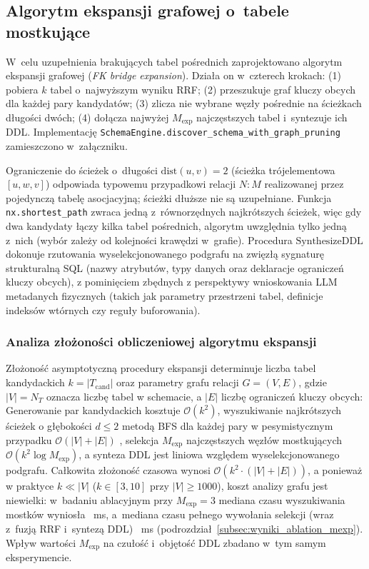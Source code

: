 \subsection{Algorytm ekspansji grafowej o~tabele mostkujące}
\label{subsec:projekt_graph_pruning}

W~celu uzupełnienia brakujących tabel pośrednich zaprojektowano algorytm ekspansji grafowej (\emph{FK bridge expansion}). Działa on w~czterech krokach: (1) pobiera $k$ tabel o~najwyższym wyniku RRF; (2) przeszukuje graf kluczy obcych dla każdej pary kandydatów; (3) zlicza nie wybrane węzły pośrednie na ścieżkach długości dwóch; (4) dołącza najwyżej $M_{\text{exp}}$ najczęstszych tabel i~syntezuje ich DDL. Implementację \texttt{SchemaEngine.discover\_schema\_with\_graph\_pruning} zamieszczono w~załączniku.

Ograniczenie do ścieżek o~długości $\text{dist}(u, v) = 2$ (ścieżka trójelementowa $[u, w, v]$) odpowiada typowemu przypadkowi relacji $N:M$ realizowanej przez pojedynczą tabelę asocjacyjną; ścieżki dłuższe nie są uzupełniane. Funkcja \texttt{nx.shortest\_path} zwraca jedną z~równorzędnych najkrótszych ścieżek, więc gdy dwa kandydaty łączy kilka tabel pośrednich, algorytm uwzględnia tylko jedną z~nich (wybór zależy od kolejności krawędzi w~grafie). Procedura $\text{SynthesizeDDL}$ dokonuje rzutowania wyselekcjonowanego podgrafu na zwięzłą sygnaturę strukturalną SQL (nazwy atrybutów, typy danych oraz deklaracje ograniczeń kluczy obcych), z pominięciem zbędnych z perspektywy wnioskowania LLM metadanych fizycznych (takich jak parametry przestrzeni tabel, definicje indeksów wtórnych czy reguły buforowania).

\subsubsection*{Analiza złożoności obliczeniowej algorytmu ekspansji}
Złożoność asymptotyczną procedury ekspansji determinuje liczba tabel kandydackich $k = |T_{\text{cand}}|$ oraz parametry grafu relacji $G = (V, E)$, gdzie $|V| = N_T$ oznacza liczbę tabel w schemacie, a $|E|$ liczbę ograniczeń kluczy obcych:
Generowanie par kandydackich kosztuje $\mathcal{O}(k^2)$, wyszukiwanie najkrótszych ścieżek o głębokości $d \le 2$ metodą BFS dla każdej pary w pesymistycznym przypadku $\mathcal{O}(|V| + |E|)$ , selekcja $M_{\text{exp}}$ najczęstszych węzłów mostkujących $\mathcal{O}(k^2 \log M_{\text{exp}})$, a synteza DDL jest liniowa względem wyselekcjonowanego podgrafu.
Całkowita złożoność czasowa wynosi $\mathcal{O}(k^2 \cdot (|V| + |E|))$, a ponieważ w praktyce $k \ll |V|$ ($k \in [3, 10]$ przy $|V| \ge 1000$), koszt analizy grafu jest niewielki: w~badaniu ablacyjnym przy $M_{\text{exp}} = 3$ mediana czasu wyszukiwania mostków wyniosła \wynTBridgeMed~ms, a~mediana czasu pełnego wywołania selekcji (wraz z~fuzją RRF i~syntezą DDL) \wynTTotalMed~ms (podrozdział~\ref{subsec:wyniki_ablation_mexp}). Wpływ wartości $M_{\text{exp}}$ na czułość i~objętość DDL zbadano w~tym samym eksperymencie.


